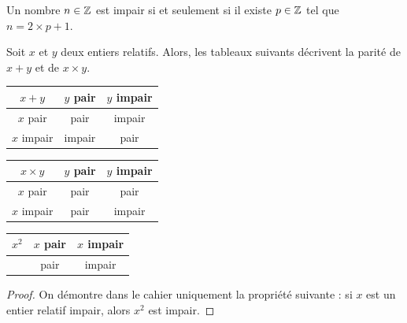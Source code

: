 \documentclass{poly}
\begin{document}
\begin{proposition}
Un nombre $n \in \mathbb{Z}$ est impair si et seulement si il existe $p \in \mathbb{Z}$ tel que $n = 2 \times p + 1$.
\end{proposition}

\begin{proposition}
Soit $x$ et $y$ deux entiers relatifs. Alors, les tableaux suivants décrivent la parité de $x + y$ et de $x \times y$.
\vspace*{0.5cm}

\begin{minipage}{0.30\textwidth}
\begin{tabular}{|c|c|c|}
\hline
$x + y$&$y$ pair&$y$ impair\\
\hline
$x$ pair&pair& impair\\
\hline
$x$ impair& impair& pair\\
\hline
\end{tabular}    
\end{minipage}
\hfill
\begin{minipage}{0.30\textwidth}
\begin{tabular}{|c|c|c|}
\hline
$x \times y$&$y$ pair&$y$ impair\\
\hline
$x$ pair&pair& pair\\
\hline
$x$ impair& pair& impair\\
\hline
\end{tabular}    
\end{minipage}
\hfill
\begin{minipage}{0.30\textwidth}
\begin{tabular}{|c|c|c|}
\hline
$x^2$&$x$ pair&$x$ impair\\
\hline
&pair& impair\\
\hline
\end{tabular}    
\end{minipage}
\end{proposition}
\begin{proof}
On démontre dans le cahier uniquement la propriété suivante : si $x$ est un entier relatif impair, alors $x^2$ est impair.
\end{proof}

\newpage
\end{document}
